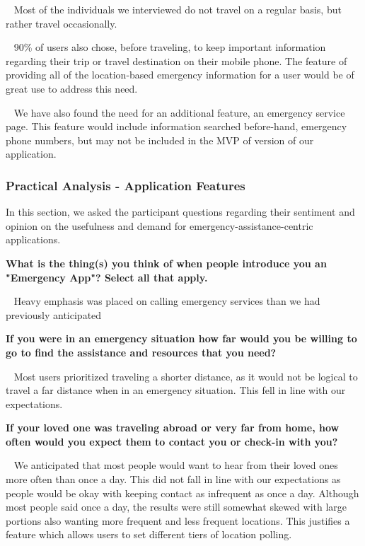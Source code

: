 \documentclass{scrreprt}
\begin{document}
\par ~ Most of the individuals we interviewed do not travel on a regular basis, but rather travel occasionally. 

\par ~ 90\% of users also chose, before traveling, to keep important information regarding their trip or travel destination on their mobile phone. The feature of providing all of the location-based emergency information for a user would be of great use to address this need.

\par ~ We have also found the need for an additional feature, an emergency service page. This feature would include information searched before-hand, emergency phone numbers, but may not be included in the MVP of version of our application.

\subsubsection{Practical Analysis - Application Features}
In this section, we asked the participant questions regarding their sentiment and opinion on the usefulness and demand for emergency-assistance-centric applications.

\textbf{What is the thing(s) you think of when people introduce you an "Emergency App"? Select all that apply.}
\par ~ Heavy emphasis was placed on calling emergency services than we had previously anticipated

\textbf{If you were in an emergency situation how far would you be willing to go to find the assistance and resources that you need?}
\par ~ Most users prioritized traveling a shorter distance, as it would not be logical to travel a far distance when in an emergency situation. This fell in line with our expectations.

\textbf{If your loved one was traveling abroad or very far from home, how often would you expect them to contact you or check-in with you?}
\par ~ We anticipated that most people would want to hear from their loved ones more often than once a day. This did not fall in line with our expectations as people would be okay with keeping contact as infrequent as once a day. Although most people said once a day, the results were still somewhat skewed with large portions also wanting more frequent and less frequent locations. This justifies a feature which allows users to set different tiers of location polling.
\end{document}
